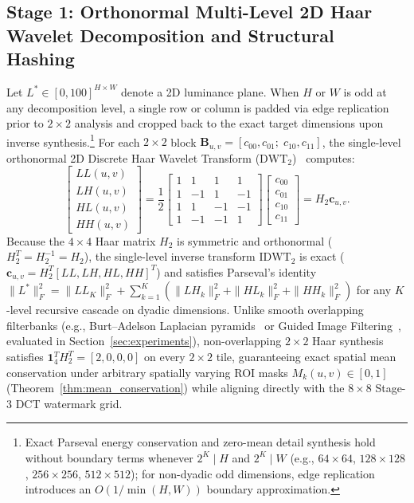 \documentclass[conference,10pt]{IEEEtran}
\begin{document}
\subsection{Stage 1: Orthonormal Multi-Level 2D Haar Wavelet Decomposition and Structural Hashing}
Let $L^* \in [0, 100]^{H \times W}$ denote a 2D luminance plane. When $H$ or $W$ is odd at any decomposition level, a single row or column is padded via edge replication prior to $2\times 2$ analysis and cropped back to the exact target dimensions upon inverse synthesis.\footnote{Exact Parseval energy conservation and zero-mean detail synthesis hold without boundary terms whenever $2^K \mid H$ and $2^K \mid W$ (e.g., $64\times 64$, $128\times 128$, $256\times 256$, $512\times 512$); for non-dyadic odd dimensions, edge replication introduces an $O(1/\min(H,W))$ boundary approximation.} For each $2\times 2$ block $\mathbf{B}_{u,v} = [c_{00}, c_{01};\; c_{10}, c_{11}]$, the single-level orthonormal 2D Discrete Haar Wavelet Transform ($\mathrm{DWT}_2$)~\cite{haar1910,mallat1989} computes:
\begin{equation}
\label{eq:haar_dwt}
\begin{bmatrix} LL(u,v) \\ LH(u,v) \\ HL(u,v) \\ HH(u,v) \end{bmatrix}
= \frac{1}{2}
\begin{bmatrix}
1 & 1 & 1 & 1 \\
1 & -1 & 1 & -1 \\
1 & 1 & -1 & -1 \\
1 & -1 & -1 & 1
\end{bmatrix}
\begin{bmatrix} c_{00} \\ c_{01} \\ c_{10} \\ c_{11} \end{bmatrix}
= H_2 \mathbf{c}_{u,v}.
\end{equation}
Because the $4\times 4$ Haar matrix $H_2$ is symmetric and orthonormal ($H_2^T = H_2^{-1} = H_2$), the single-level inverse transform $\mathrm{IDWT}_2$ is exact ($\mathbf{c}_{u,v} = H_2^T [LL, LH, HL, HH]^T$) and satisfies Parseval's identity $\|L^*\|_F^2 = \|LL_K\|_F^2 + \sum_{k=1}^K (\|LH_k\|_F^2 + \|HL_k\|_F^2 + \|HH_k\|_F^2)$ for any $K$-level recursive cascade on dyadic dimensions. Unlike smooth overlapping filterbanks (e.g., Burt--Adelson Laplacian pyramids~\cite{burt1983} or Guided Image Filtering~\cite{he2013guided}, evaluated in Section~\ref{sec:experiments}), non-overlapping $2\times 2$ Haar synthesis satisfies $\mathbf{1}_4^T H_2^T = [2, 0, 0, 0]$ on every $2\times 2$ tile, guaranteeing exact spatial mean conservation under arbitrary spatially varying ROI masks $M_k(u,v) \in [0, 1]$ (Theorem~\ref{thm:mean_conservation}) while aligning directly with the $8\times 8$ Stage-3 DCT watermark grid.
\end{document}
